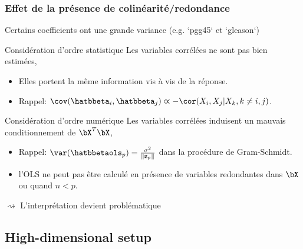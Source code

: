 \documentclass{beamer}\usepackage[]{graphicx}\usepackage[]{color}
\begin{document}
\begin{frame}
  \frametitle{Effet de la présence de colinéarité/redondance}
  
  Certains coefficients ont une grande variance (e.g. `pgg45` et `gleason`)

  \begin{block}{Considération d'ordre statistique}
    \alert{Les variables corrélées ne sont pas bien estimées},
    \\

    \begin{itemize}
    \item  Elles portent la même information vis à vis de la réponse.
    \item  Rappel:  $\cov(\hatbbeta_i,\hatbbeta_j)  \varpropto  - \cor(X_i,X_j|X_k,k\neq i,j)$.
    \end{itemize}

  \end{block}

  \vfill

  \begin{block}{Considération d'ordre numérique}
    \alert{Les variables corrélées induisent un mauvais conditionnement de $\bX^T\bX$},

    \begin{itemize}
    \item       Rappel:  $\var(\hatbbetaols_p)       = \frac{\sigma^2}{\|\mathbf{z}_p\|}$ dans la procédure de   Gram-Schmidt.

    \item l'OLS ne peut pas être calculé en présence de variables redondantes dans 
      $\bX$ \alert{ou quand  $n<p$}.
    \end{itemize}
  \end{block}

$\rightsquigarrow$ L'interprétation devient problématique
\end{frame}


\subsection{High-dimensional setup}
\end{document}
